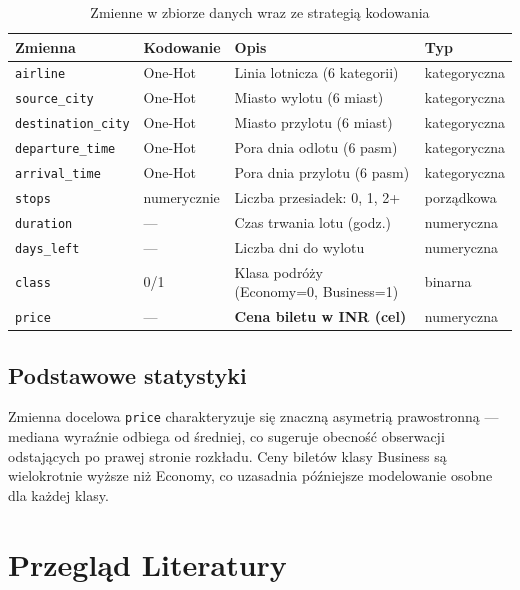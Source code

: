 \documentclass[12pt,a4paper]{article}
\begin{document}
	\begin{table}[H]
		\centering
		\begin{tabularx}{\textwidth}{llXl}
			\toprule
			\textbf{Zmienna} & \textbf{Kodowanie} & \textbf{Opis} & \textbf{Typ} \\
			\midrule
			\texttt{airline}           & One-Hot & Linia lotnicza (6 kategorii)           & kategoryczna \\
			\texttt{source\_city}      & One-Hot & Miasto wylotu (6 miast)                & kategoryczna \\
			\texttt{destination\_city} & One-Hot & Miasto przylotu (6 miast)              & kategoryczna \\
			\texttt{departure\_time}   & One-Hot & Pora dnia odlotu (6 pasm)              & kategoryczna \\
			\texttt{arrival\_time}     & One-Hot & Pora dnia przylotu (6 pasm)            & kategoryczna \\
			\texttt{stops}             & numerycznie & Liczba przesiadek: 0, 1, 2+        & porządkowa   \\
			\texttt{duration}          & ---     & Czas trwania lotu (godz.)              & numeryczna   \\
			\texttt{days\_left}        & ---     & Liczba dni do wylotu                   & numeryczna   \\
			\texttt{class}             & 0/1     & Klasa podróży (Economy=0, Business=1)  & binarna      \\
			\texttt{price}             & ---     & \textbf{Cena biletu w INR (cel)}       & numeryczna   \\
			\bottomrule
		\end{tabularx}
		\caption{Zmienne w zbiorze danych wraz ze strategią kodowania}
	\end{table}
	
	\subsection{Podstawowe statystyki}
	
	Zmienna docelowa \texttt{price} charakteryzuje się znaczną asymetrią prawostronną
	--- mediana wyraźnie odbiega od średniej, co sugeruje obecność obserwacji
	odstających po prawej stronie rozkładu. Ceny biletów klasy Business są
	wielokrotnie wyższe niż Economy, co uzasadnia późniejsze modelowanie osobne dla
	każdej klasy.
	
	\section{Przegląd Literatury}
	
\end{document}
